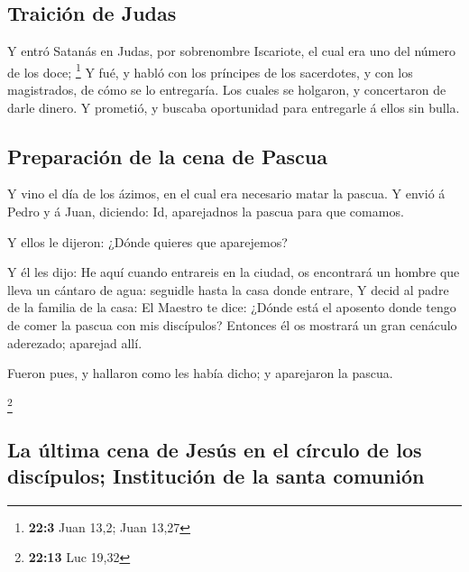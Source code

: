 \hypertarget{traiciuxf3n-de-judas}{%
\subsection{Traición de Judas}\label{traiciuxf3n-de-judas}}

 Y entró Satanás en Judas, por sobrenombre Iscariote, el
cual era uno del número de los doce; \footnote{\textbf{22:3} Juan 13,2;
  Juan 13,27}  Y fué, y habló con los príncipes de los
sacerdotes, y con los magistrados, de cómo se lo entregaría.
 Los cuales se holgaron, y concertaron de darle dinero.
 Y prometió, y buscaba oportunidad para entregarle á ellos
sin bulla.

\hypertarget{preparaciuxf3n-de-la-cena-de-pascua}{%
\subsection{Preparación de la cena de
Pascua}\label{preparaciuxf3n-de-la-cena-de-pascua}}

 Y vino el día de los ázimos, en el cual era necesario
matar la pascua.  Y envió á Pedro y á Juan, diciendo: Id,
aparejadnos la pascua para que comamos.

 Y ellos le dijeron: ¿Dónde quieres que aparejemos?

 Y él les dijo: He aquí cuando entrareis en la ciudad, os
encontrará un hombre que lleva un cántaro de agua: seguidle hasta la
casa donde entrare,  Y decid al padre de la familia de la
casa: El Maestro te dice: ¿Dónde está el aposento donde tengo de comer
la pascua con mis discípulos?  Entonces él os mostrará un
gran cenáculo aderezado; aparejad allí.

 Fueron pues, y hallaron como les había dicho; y
aparejaron la pascua.

\footnote{\textbf{22:13} Luc 19,32}

\hypertarget{la-uxfaltima-cena-de-jesuxfas-en-el-cuxedrculo-de-los-discuxedpulos-instituciuxf3n-de-la-santa-comuniuxf3n}{%
\subsection{La última cena de Jesús en el círculo de los discípulos;
Institución de la santa
comunión}\label{la-uxfaltima-cena-de-jesuxfas-en-el-cuxedrculo-de-los-discuxedpulos-instituciuxf3n-de-la-santa-comuniuxf3n}}

